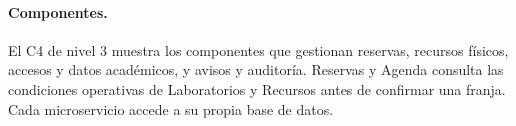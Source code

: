 \paragraph{Componentes.}
El C4 de nivel 3 muestra los componentes que gestionan reservas, recursos
físicos, accesos y datos académicos, y avisos y auditoría. Reservas y Agenda
consulta las condiciones operativas de Laboratorios y Recursos antes de
confirmar una franja. Cada microservicio accede a su propia base de datos.
